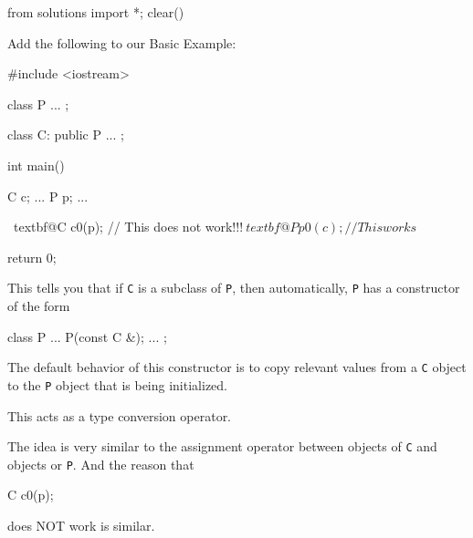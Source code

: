 \begin{python0}
from solutions import *; clear()
\end{python0}

Add the following to our Basic Example:
\begin{console}[commandchars=\~\@\$]
#include <iostream>

class P
{     
      ...
};

class C: public P
{
        ...
};

int main()
{   
    C c;
    ...
    P p;
    ...
    
    ~textbf@C c0(p); // This does not work!!!$
    ~textbf@P p0(c); // This works$

    return 0;
}
\end{console}

This tells you that if \verb!C! is a subclass of \verb!P!, then automatically, \verb!P! has a constructor of the form
\begin{console}
class P
{     
      ...
      P(const C &);
      ...
};
\end{console}

The default behavior of this constructor is to copy relevant values from
a \verb!C! object to the \verb!P! object that is being initialized.

This acts as a type conversion operator.

The idea is very similar to the assignment operator between objects of
\verb!C! and objects or \verb!P!. And the reason that
\begin{console}
C c0(p);
\end{console}

does NOT work is similar.

